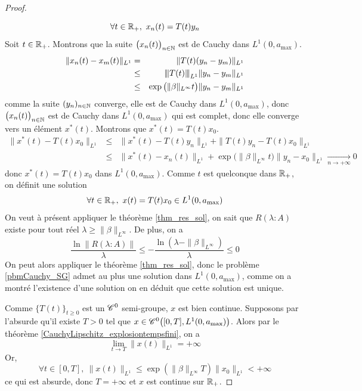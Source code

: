 \begin{proof}
\begin{enumerate}
    \begin{equation*}
        \forall t \in \mathbb{R}_+, \ x_n(t) = T(t)y_n
    \end{equation*}
    Soit $t \in \mathbb{R}_+$. Montrons que la suite $\big(x_n(t)\big)_{n \in \mathbb{N}}$ est de Cauchy dans $L^1(0,a_{\max})$.
    \begin{eqnarray*}
        \|x_n(t)-x_m(t)\|_{L^1} &=& \|T(t)(y_n-y_m)\|_{L^1} \\
        &\leq& {\left\vert\kern-0.25ex\left\vert \kern-0.25ex\left\vert T(t) \right\vert\kern-0.25ex\right\vert\kern-0.25ex\right\vert}_{L^1}\|y_n-y_m\|_{L^1} \\
        &\leq& \exp\big(\|\beta\|_{L^\infty}t\big)\|y_n-y_m\|_{L^1}
    \end{eqnarray*}
    comme la suite $(y_n)_{n \in \mathbb{N}}$ converge, elle est de Cauchy dans $L^1(0,a_{\max})$, donc $\big(x_n(t)\big)_{n \in \mathbb{N}}$ est de Cauchy dans $L^1(0,a_{\max})$ qui est complet, donc elle converge vers un élément $x^*(t)$. Montrons que $x^*(t)=T(t)x_0$.
    \begin{eqnarray*}
        \|x^*(t)-T(t)x_0\|_{L^1} &\leq& \|x^*(t)-T(t)y_n\|_{L^1}+\|T(t)y_n-T(t)x_0\|_{L^1} \\
        &\leq& \|x^*(t)-x_n(t)\|_{L^1} + \exp\big(\|\beta\|_{L^\infty}t)\|y_n - x_0\|_{L^1} \underset{n \to +\infty}{\longrightarrow} 0
    \end{eqnarray*}
    donc $x^*(t)=T(t)x_0$ dans $L^1(0,a_{\max})$. Comme $t$ est quelconque dans $\mathbb{R}_+$, on définit une solution 
    \begin{equation*}
        \forall t \in \mathbb{R}_+, \ x(t)=T(t)x_0 \in L^1(0,a_{\max})
    \end{equation*}
    On veut à présent appliquer le théorème \ref{thm_res_sol}, on sait que $R(\lambda : A)$ existe pour tout réel $\lambda \geq \|\beta\|_{L^\infty}$. De plus, on a 
    \begin{equation*}
        \frac{\ln\|R(\lambda:A)\|}{\lambda} \leq -\frac{\ln(\lambda - \|\beta\|_{L^\infty})}{\lambda} \leq 0
    \end{equation*}
    On peut alors appliquer le théorème \ref{thm_res_sol}, donc le problème \eqref{pbmCauchy_SG} admet au plus une solution dans $L^1(0,a_{\max})$, comme on a montré l'existence d'une solution on en déduit que cette solution est unique.
    \end{enumerate}
    Comme $\big\{T(t)\big\}_{t \geq 0}$ est un $\mathscr{C}^0$ semi-groupe, $x$ est bien continue. Supposons par l'absurde qu'il existe $T>0$ tel que $x \in \mathscr{C}^0\big([0,T],L^1(0,a_{\max})\big)$. Alors par le théorème \ref{CauchyLipschitz_explosiontempsfini}, on a 
    \begin{equation*}
        \lim_{t \to T}\|x(t)\|_{L^1} = +\infty
    \end{equation*}
    Or, 
    \begin{equation*}
        \forall t \in [0,T], \ \|x(t)\|_{L^1} \leq \exp(\|\beta\|_{L^\infty}T)\|x_0\|_{L^1}<+\infty
    \end{equation*}
    ce qui est absurde, donc $T=+\infty$ et $x$ est continue sur $\mathbb{R}_+$.
\end{proof}

